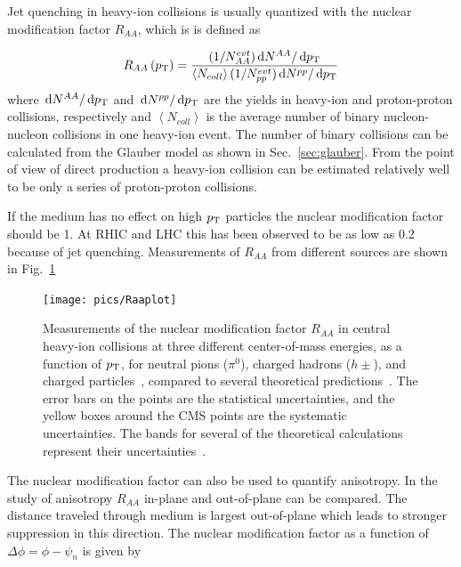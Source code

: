 Jet quenching in heavy-ion collisions is usually quantized with the nuclear modification factor $R_{AA}$, which is  is defined as

\begin{equation}
R_{AA}\left(p_{\rm T}\right) = \frac{(1/N_{AA}^{evt})\,\textrm d{N^{AA}}/\,\textrm d{p_{\rm T}}}{\left< N_{coll}\right> (1/N_{pp}^{evt})\,\textrm d{N^{pp}}/\,\textrm d{p_{\rm T}}}\label{eq:raa}
\end{equation}
\noindent where $\,\textrm d{N^{AA}}/\,\textrm d{p_{\rm T}}$ and $\,\textrm d{N^{pp}}/\,\textrm d{p_{\rm T}}$ are the yields in heavy-ion and proton-proton collisions, respectively and $\left< N_{coll}\right>$ is the average number of binary nucleon-nucleon collisions in one heavy-ion event. The number of binary collisions can be calculated from the Glauber model as shown in Sec.~\ref{sec:glauber}. From the point of view of direct production a heavy-ion collision can be estimated relatively well to be only a series of proton-proton collisions. 

If the medium has no effect on high $p_{\rm T}$ particles the nuclear modification factor should be 1. At RHIC and LHC this has been observed to be as low as 0.2 because of jet quenching. Measurements of $R_{AA}$ from different sources are shown in Fig.~\ref{fig:Raa}

\begin{figure}[hbt]
	\centering
                \texttt{[image: pics/Raaplot]}
        \caption[Measurements of the nuclear modification factor $R_{AA}$ in central heavy-ion collisions]{Measurements of the nuclear modification factor $R_{AA}$ in central heavy-ion collisions at three different center-of-mass energies, as a function of $p_{\rm T}$, for neutral pions ($\pi^0$), charged hadrons ($h\pm$), and charged particles~\cite{Aamodt:2010jd, Aggarwal:2001gn, d'Enterria:2004ig, Adare:2008qa, Adams:2003kv}, compared to several theoretical predictions~\cite{Dainese:2004te, Vitev:2002pf, Vitev:2004bh, Salgado:2003gb, Armesto:2005iq, Renk:2011gj}. The error bars on the points are the statistical uncertainties, and the yellow boxes around the CMS points are the systematic uncertainties. The bands for several of the theoretical calculations represent their uncertainties~\cite{CMS:2012aa}.}
        \label{fig:Raa}
\end{figure}


The nuclear modification factor can also be used to quantify anisotropy. In the study of anisotropy $R_{AA}$ in-plane and out-of-plane can be compared. The distance traveled through medium is largest out-of-plane which leads to stronger suppression in this direction. The nuclear modification factor as a function of $\Delta\phi=\phi-\psi_n$ is given by

